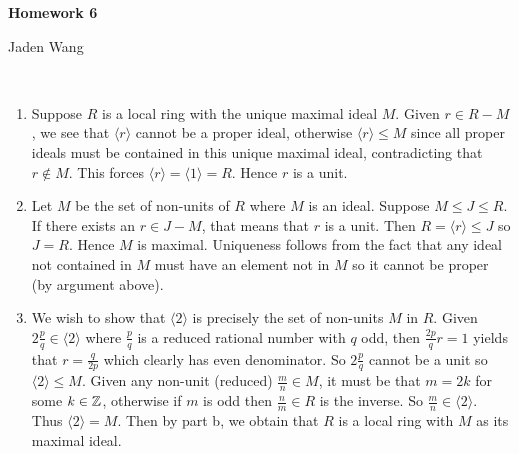 \documentclass[12pt]{article}
\begin{document}
\centerline {\textsf{\textbf{\LARGE{Homework 6}}}}
\centerline {Jaden Wang}
\vspace{.15in}

\begin{problem}[1]
~\begin{enumerate}[label=(\arabic*)]
	\item Suppose $ R$ is a local ring with the unique maximal ideal  $ M$. Given  $ r \in R - M$, we see that $ \langle r \rangle$ cannot be a proper ideal, otherwise $ \langle r \rangle \leq M$ since all proper ideals must be contained in this unique maximal ideal, contradicting that $ r \not\in M$. This forces $ \langle r \rangle = \langle 1 \rangle =R$. Hence $ r$ is a unit.
	\item Let  $ M$ be the set of non-units of  $ R$ where $ M$ is an ideal. Suppose  $ M \leq J \leq R$. If there exists an  $ r \in J -M$, that means that $ r$ is a unit. Then  $R= \langle r \rangle \leq J$ so $ J=R$. Hence $ M$ is maximal. Uniqueness follows from the fact that any ideal not contained in $ M$ must have an element not in $ M$ so it cannot be proper (by argument above).
	\item We wish to show that $ \langle 2 \rangle$ is precisely the set of non-units $ M$ in $ R$. Given $ 2 \frac{p}{q} \in \langle 2 \rangle$ where $ \frac{p}{q}$ is a reduced rational number with $ q$ odd, then  $ \frac{2p}{q} r = 1$ yields that  $ r= \frac{q}{2p}$ which clearly has even denominator. So $ 2 \frac{p}{q}$ cannot be a unit so $ \langle 2 \rangle \leq M$. Given any non-unit (reduced) $ \frac{m}{n} \in M$, it must be that $ m = 2k$ for some  $ k \in \mathbb{Z}$, otherwise if $ m$ is odd then $ \frac{n}{m} \in R$ is the inverse. So $ \frac{m}{n} \in \langle 2 \rangle$. Thus $ \langle 2 \rangle = M$. Then by part b, we obtain that $ R$ is a local ring with $ M$  as its maximal ideal.
\end{enumerate}
\end{problem}
\end{document}
